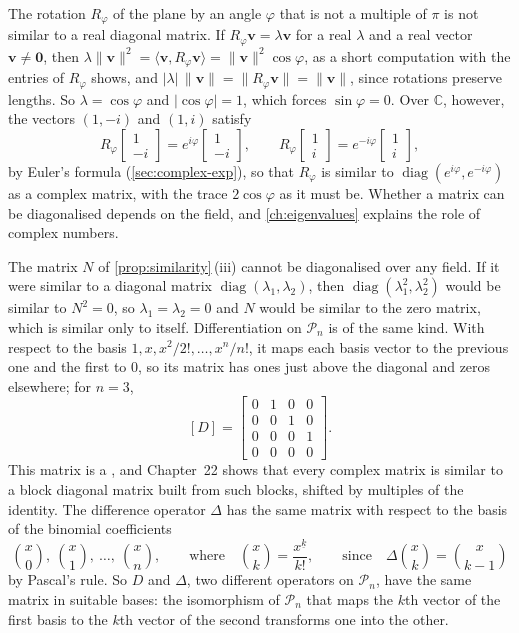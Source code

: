 The rotation $R_\varphi$ of the plane by an angle $\varphi$ that is not a multiple of $\pi$ is not similar to a real diagonal matrix. If $R_\varphi\mathbf v=\lambda\mathbf v$ for a real $\lambda$ and a real vector $\mathbf v\ne\mathbf 0$, then $\lambda\|\mathbf v\|^2=\langle\mathbf v,R_\varphi\mathbf v\rangle=\|\mathbf v\|^2\cos\varphi$, as a short computation with the entries of $R_\varphi$ shows, and $|\lambda|\,\|\mathbf v\|=\|R_\varphi\mathbf v\|=\|\mathbf v\|$, since rotations preserve lengths. So $\lambda=\cos\varphi$ and $|\cos\varphi|=1$, which forces $\sin\varphi=0$. Over $\mathbb C$, however, the vectors $(1,-i)$ and $(1,i)$ satisfy
\[
R_\varphi\begin{bmatrix}1\\-i\end{bmatrix}=e^{i\varphi}\begin{bmatrix}1\\-i\end{bmatrix},\qquad R_\varphi\begin{bmatrix}1\\i\end{bmatrix}=e^{-i\varphi}\begin{bmatrix}1\\i\end{bmatrix},
\]
by Euler's formula (\cref{sec:complex-exp}), so that $R_\varphi$ is similar to $\operatorname{diag}(e^{i\varphi},e^{-i\varphi})$ as a complex matrix, with the trace $2\cos\varphi$ as it must be. Whether a matrix can be diagonalised depends on the field, and \cref{ch:eigenvalues} explains the role of complex numbers.

The matrix $N$ of \cref{prop:similarity}\,(iii) cannot be diagonalised over any field. If it were similar to a diagonal matrix $\operatorname{diag}(\lambda_1,\lambda_2)$, then $\operatorname{diag}(\lambda_1^2,\lambda_2^2)$ would be similar to $N^2=0$, so $\lambda_1=\lambda_2=0$ and $N$ would be similar to the zero matrix, which is similar only to itself. Differentiation on $\mathcal P_n$ is of the same kind. With respect to the basis $1,x,x^2/2!,\ldots,x^n/n!$, it maps each basis vector to the previous one and the first to $0$, so its matrix has ones just above the diagonal and zeros elsewhere; for $n=3$,
\[
[D]=\begin{bmatrix}0&1&0&0\\0&0&1&0\\0&0&0&1\\0&0&0&0\end{bmatrix}.
\]
This matrix is a , and Chapter~22 shows that every complex matrix is similar to a block diagonal matrix built from such blocks, shifted by multiples of the identity. The difference operator $\Delta$ has the same matrix with respect to the basis of the binomial coefficients
\[
\binom x0,\ \binom x1,\ \ldots,\ \binom xn,\qquad\text{where}\quad\binom xk=\frac{x^{\underline k}}{k!},\qquad\text{since}\quad\Delta\binom xk=\binom x{k-1}
\]
by Pascal's rule. So $D$ and $\Delta$, two different operators on $\mathcal P_n$, have the same matrix in suitable bases: the isomorphism of $\mathcal P_n$ that maps the $k$th vector of the first basis to the $k$th vector of the second transforms one into the other.

